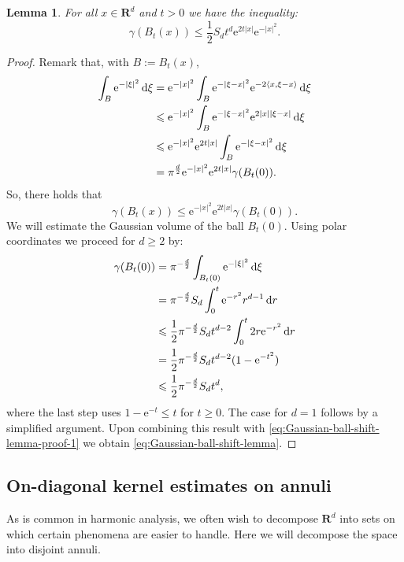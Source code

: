 \documentclass{amsart}
\newtheorem{lemma}{Lemma}
\theoremstyle{remark}
\newcommand{\D}{\,\textup{d}}
\newcommand{\la}{\langle}
\newcommand{\ra}{\rangle}
\renewcommand{\leq}{\leqslant}
\renewcommand{\geq}{\geqslant}
\newcommand{\R}{\mathbf R}
\newcommand{\e}{\mathrm{e}} %
\begin{document}
\begin{lemma}\label{lem:Gaussian-ball-shift-lemma}
  For all $x \in \R^d$ and $t > 0$ we have the inequality:
  \begin{equation}\label{eq:Gaussian-ball-shift-lemma}
    \gamma(B_t(x)) \leq \frac12 S_d t^{d} \e^{2t|x|} \e^{-|x|^2}. 
  \end{equation}
\end{lemma}
\begin{proof}
  Remark that, with $B := B_t(x)$,
  \begin{align*}
    \int_B \e^{-|\xi|^2} \D\xi &= \e^{-|x|^2} \int_{B} \e^{-|\xi -
      x|^2} \e^{-2 \la x, \xi - x \ra} \D\xi\\
    &\leq \e^{-|x|^2} \int_{B} \e^{-|\xi - x|^2} \e^{2 |x| |\xi - x|}
    \D\xi\\
    &\leq \e^{-|x|^2} \e^{2 t|x|} \int_{B} \e^{-|\xi - x|^2} \D\xi\\
    &= \pi^{\frac{d}2} \e^{-|x|^2} \e^{2 t|x|} \gamma(B_t(0)).
  \end{align*}
  So, there holds that
  \begin{equation}\label{eq:Gaussian-ball-shift-lemma-proof-1}
    \gamma(B_t(x)) \leq \e^{-|x|^2} \e^{2 t|x|} \gamma(B_t(0)).
  \end{equation}
  We will estimate the Gaussian volume of the ball $B_t(0)$. Using polar coordinates
  we proceed for $d \geq 2$ by: 
  \begin{align*}
    \gamma(B_t(0)) &= \pi^{-\frac{d}2} \int_{B_t(0)} \e^{-|\xi|^2} \D\xi\\
    &=\pi^{-\frac{d}2}S_d \int_0^t \e^{-r^2} r^{d - 1} \D{r}\\
    &\leq\frac12 \pi^{-\frac{d}2}S_d t^{d-2} \int_0^t 2r \e^{-r^2} \D{r}\\
    &= \frac12 \pi^{-\frac{d}2}S_d t^{d-2} (1-\e^{-t^2})\\
    &\leq \frac12 \pi^{-\frac{d}2}S_d t^{d},
  \end{align*}
  where the last step uses $1 - \e^{-t} \leq t$ for $t \geq 0$. The case
  for $d = 1$ follows by a simplified argument.
  Upon combining this result with
  \eqref{eq:Gaussian-ball-shift-lemma-proof-1} we obtain
  \eqref{eq:Gaussian-ball-shift-lemma}.
\end{proof}

\subsection{On-diagonal kernel estimates on annuli}
As is common in harmonic analysis, we often wish to decompose
$\R^d$ into sets on which certain phenomena are easier to handle. Here
we will decompose the space into disjoint annuli. 
\end{document}
